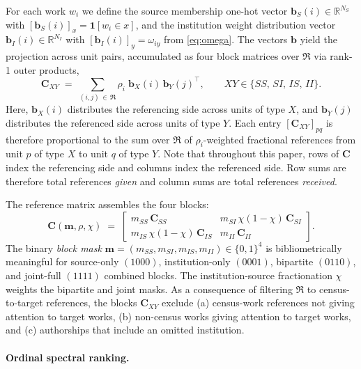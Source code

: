 For each work $w_i$ we define the source membership one-hot vector
$\mathbf{b}_S(i)\in\mathbb{R}^{N_S}$ with $[\mathbf{b}_S(i)]_x=\mathbf{1}[w_i\in x]$,
and the institution weight distribution vector
$\mathbf{b}_I(i)\in\mathbb{R}^{N_I}$ with $[\mathbf{b}_I(i)]_y=\omega_{iy}$
from \eqref{eq:omega}. The vectors $\mathbf{b}$ yield the projection across unit
pairs, accumulated as four block matrices over $\mathfrak{R}$ via
rank-1 outer products,
\begin{equation}
	\mathbf{C}_{XY} \;=\; \sum_{(i,j)\,\in\,\mathfrak{R}}
	\rho_i\;\mathbf{b}_X(i)\,\mathbf{b}_Y(j)^\top,
	\qquad XY\in\{SS,\,SI,\,IS,\,II\}.
	\label{eq:Cblock}
\end{equation}
Here, $\mathbf{b}_X(i)$ distributes the referencing side across
units of type $X$, and $\mathbf{b}_Y(j)$ distributes the referenced side
across units of type $Y$. Each entry $[\mathbf{C}_{XY}]_{pq}$ is therefore proportional
to the sum over $\mathfrak{R}$ of $\rho_i$-weighted fractional references from unit $p$ of type $X$ to unit $q$ of type $Y$. Note that throughout this paper, rows of $\mathbf{C}$ index the referencing side and columns index the referenced side. Row sums are therefore total references \emph{given} and column sums are total references \emph{received}.

The reference matrix assembles the four blocks:
\begin{equation}
	\mathbf{C}(\mathbf{m},\rho,\chi) \;=\;
	\begin{bmatrix}
		m_{SS}\,\mathbf{C}_{SS} &
		m_{SI}\,\chi(1-\chi)\,\mathbf{C}_{SI} \\[4pt]
		m_{IS}\,\chi(1-\chi)\,\mathbf{C}_{IS} &
		m_{II}\,\mathbf{C}_{II}
	\end{bmatrix}.
	\label{eq:C}
\end{equation}
The binary \textit{block mask} $\mathbf{m}=(m_{SS},m_{SI},m_{IS},m_{II})\in\{0,1\}^4$
is bibliometrically meaningful for source-only $(1000)$, institution-only $(0001)$,
bipartite $(0110)$, and joint-full $(1111)$ combined blocks.
The institution-source fractionation $\chi$ weights the bipartite and joint masks.
As a consequence of filtering $\mathfrak{R}$ to census-to-target references, the blocks $\mathbf{C}_{XY}$ exclude (a) census-work references not giving
attention to target works, (b) non-census works giving attention to
target works, and (c) authorships that include an omitted institution.

\paragraph{Ordinal spectral ranking.}

